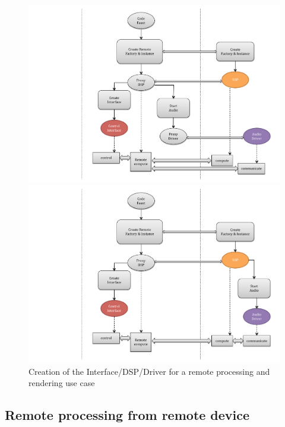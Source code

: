 \documentclass[a4paper]{article}
\begin{document}
\begin{figure}[!h]
\begin{center}
\begin{minipage}[c]{.45\linewidth}
\includegraphics[width=\columnwidth]{images/CCC71}
\end{minipage}
\begin{minipage}[r]{.45\linewidth}
\includegraphics[width=\columnwidth]{images/CCC72}
\end{minipage}
\caption{Creation of the Interface/DSP/Driver for a remote processing and rendering use case}
\label{fig:CCC4}
\end{center}
\end{figure}

\newpage
\subsection{ Remote processing from remote device}
\end{document}
